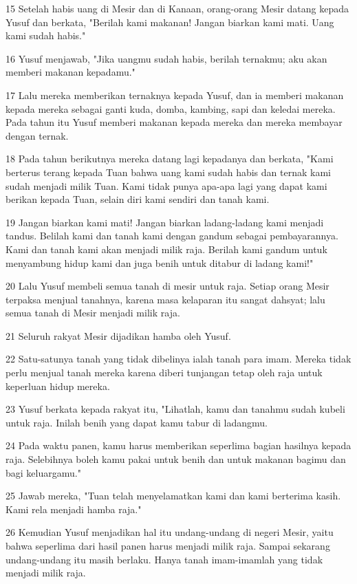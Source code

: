 \par 15 Setelah habis uang di Mesir dan di Kanaan, orang-orang Mesir datang kepada Yusuf dan berkata, "Berilah kami makanan! Jangan biarkan kami mati. Uang kami sudah habis."
\par 16 Yusuf menjawab, "Jika uangmu sudah habis, berilah ternakmu; aku akan memberi makanan kepadamu."
\par 17 Lalu mereka memberikan ternaknya kepada Yusuf, dan ia memberi makanan kepada mereka sebagai ganti kuda, domba, kambing, sapi dan keledai mereka. Pada tahun itu Yusuf memberi makanan kepada mereka dan mereka membayar dengan ternak.
\par 18 Pada tahun berikutnya mereka datang lagi kepadanya dan berkata, "Kami berterus terang kepada Tuan bahwa uang kami sudah habis dan ternak kami sudah menjadi milik Tuan. Kami tidak punya apa-apa lagi yang dapat kami berikan kepada Tuan, selain diri kami sendiri dan tanah kami.
\par 19 Jangan biarkan kami mati! Jangan biarkan ladang-ladang kami menjadi tandus. Belilah kami dan tanah kami dengan gandum sebagai pembayarannya. Kami dan tanah kami akan menjadi milik raja. Berilah kami gandum untuk menyambung hidup kami dan juga benih untuk ditabur di ladang kami!"
\par 20 Lalu Yusuf membeli semua tanah di mesir untuk raja. Setiap orang Mesir terpaksa menjual tanahnya, karena masa kelaparan itu sangat dahsyat; lalu semua tanah di Mesir menjadi milik raja.
\par 21 Seluruh rakyat Mesir dijadikan hamba oleh Yusuf.
\par 22 Satu-satunya tanah yang tidak dibelinya ialah tanah para imam. Mereka tidak perlu menjual tanah mereka karena diberi tunjangan tetap oleh raja untuk keperluan hidup mereka.
\par 23 Yusuf berkata kepada rakyat itu, "Lihatlah, kamu dan tanahmu sudah kubeli untuk raja. Inilah benih yang dapat kamu tabur di ladangmu.
\par 24 Pada waktu panen, kamu harus memberikan seperlima bagian hasilnya kepada raja. Selebihnya boleh kamu pakai untuk benih dan untuk makanan bagimu dan bagi keluargamu."
\par 25 Jawab mereka, "Tuan telah menyelamatkan kami dan kami berterima kasih. Kami rela menjadi hamba raja."
\par 26 Kemudian Yusuf menjadikan hal itu undang-undang di negeri Mesir, yaitu bahwa seperlima dari hasil panen harus menjadi milik raja. Sampai sekarang undang-undang itu masih berlaku. Hanya tanah imam-imamlah yang tidak menjadi milik raja.
